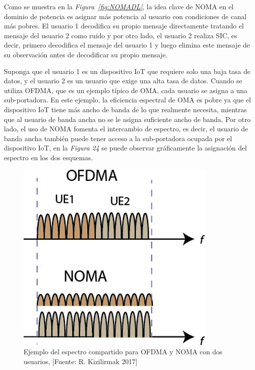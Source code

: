 Como se muestra en la \textit{Figura~\ref{fig:NOMADL}}, la idea clave de NOMA en el dominio de potencia es asignar más potencia al usuario con condiciones de canal más pobres. El usuario 1 decodifica su propio mensaje directamente tratando el mensaje del usuario 2 como ruido y por otro lado, el usuario 2 realiza SIC, es decir, primero decodifica el mensaje del usuario 1 y luego elimina este mensaje de su observación antes de decodificar su propio mensaje.\newline

Suponga que el usuario 1 es un dispositivo IoT que requiere solo una baja tasa de datos, y el usuario 2 es un usuario que exige una alta tasa de datos. Cuando se utiliza OFDMA, que es un ejemplo típico de OMA, cada usuario se asigna a una sub-portadora. En este ejemplo, la eficiencia espectral de OMA es pobre ya que el dispositivo IoT tiene más ancho de banda de lo que realmente necesita, mientras que al usuario de banda ancha no se le asigna suficiente ancho de banda. Por otro lado, el uso de NOMA fomenta el intercambio de espectro, es decir, el usuario de banda ancha también puede tener acceso a la sub-portadora ocupada por el dispositivo IoT, en la \textit{Figura 24} se puede observar gráficamente la asignación del espectro en los dos esquemas.\newline

\begin{figure}[th]
\centering
\includegraphics[scale=.87]{Figures/Ejemplo del espectro compartido para OFDMA y NOMA con dos usuarios}
\decoRule
\caption[Ejemplo del espectro compartido para OFDMA y NOMA con dos usuarios.]{Ejemplo del espectro compartido para OFDMA y NOMA con dos usuarios, [Fuente: R. Kizilirmak 2017]}
\label{fig:OFDMANOMA}
\end{figure}

